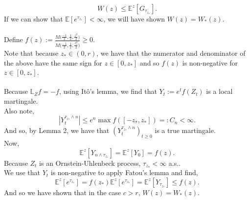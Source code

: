 \documentclass[12pt]{article}
\newcommand{\E}{\mathbb{E}}
\newcommand{\bL}{\mathbb{L}}
\theoremstyle{definition}
\begin{document}
\[
    W(z) \leq \E^z [G_{\tau_{z_*}}].
\]
If we can show that $\E[e^{\tau_{z_*}}] < \infty$, we will have shown $W(z) = W_*(z)$. \\
\\
Define $f(z) := \frac{M \big (\frac{-1}{2},\frac{1}{2},\frac{z^2}{2} \big )}{M \big (\frac{-1}{2},\frac{1}{2},\frac{z_*^2}{2} \big )} \geq 0$. \\
Note that because $z_* \in (0, r)$, we have that the numerator and denominator of the above have the same sign for $z \in [0, z_*]$ and so $f(z)$ is non-negative for $z \in [0, z_*]$. \\
\\
Because $\bL_Z f = -f$, using Itô's lemma, we find that $Y_t := e^t f(Z_t)$ is a local martingale. \\
Also note,
\[
    |Y_t^{\tau_{z_*} \wedge n}| \leq e^n \max f([-z_*, z_*]) =: C_n < \infty.
\]
And so, by Lemma 2, we have that $(Y^{\tau_{z_*} \wedge n}_t)_{t \geq 0}$ is a true martingale. \\
Now,
\[
    \E^z[Y_{n \wedge \tau_{z_*}}] = \E^z[Y_0] = f(z).
\]
Because $Z_t$ is an Ornstein-Uhlenbeck process, $\tau_{z_*} < \infty$ a.s.. \\
We use that $Y_t$ is non-negative to apply Fatou's lemma and find,
\[
    \E^z[e^{\tau_{z_*}}] = f(z_*) \E^z[ e^{\tau_{z_*}}] = \E^z[Y_{\tau_{z_*}}] \leq f(z).
\]
And so we have shown that in the case $c > r$, $W(z) = W_*(z)$. \\
\end{document}
